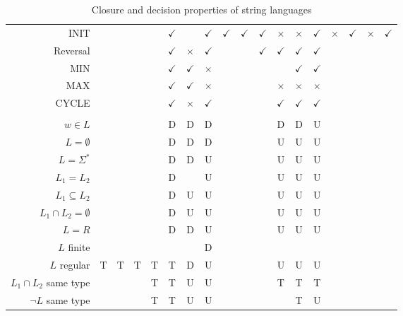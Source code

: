 \documentclass[letterpaper,10pt,oneside,landscape]{article}
\begin{document}
\begin{table}[tbph]
\begin{center}
\begin{tabular}{rcccc|ccccccccc|cccc}
        INIT & & & & & $\checkmark$ & & $\checkmark$ & $\checkmark$ & $\checkmark$ & $\checkmark$ & $\times$ & $\times$ & $\checkmark$ & $\times$ & $\checkmark$ & $\times$ & $\checkmark$\\
        Reversal & & & & & $\checkmark$ & $\times$ & $\checkmark$ & & & $\checkmark$ & $\checkmark$ & $\checkmark$ & $\checkmark$\\
        MIN & & & & & $\checkmark$ & $\checkmark$ & $\times$ & & & & & $\checkmark$ & $\checkmark$\\
        MAX & & & & & $\checkmark$ & $\checkmark$ & $\times$ & & & &$\times$ & $\times$ & $\times$\\
        CYCLE & & & & & $\checkmark$ & $\times$ & $\checkmark$ & & & &$\checkmark$ & $\checkmark$ & $\checkmark$\\
        & & & & & & & & & & & & &\\
        $w \in L$ & & & & & D & D & D & & & &D & D & U\\
        $L = \emptyset$ & & & & & D & D & D & & & &U & U & U\\
        $L = \Sigma^*$ & & & & & D & D & U & & & &U & U & U\\
        $L_1 = L_2$ & & & & & D & & U & & & &U & U & U\\
        $L_1 \subseteq L_2$ & & & & & D & U & U & & && U & U & U\\
        $L_1 \cap L_2 = \emptyset$ & & & & & D & U & U & & & & U & U & U\\
        $L=R$ & & & & & D & D & U & & & & U & U & U\\
        $L$ finite & & & & & & & D & & & & & &\\
        $L$ regular & T & T & T & T & T & D & U & & & & U & U & U\\
        $L_1 \cap L_2 $ same type & & & & T & T & U & U & & & & T & T & T\\
        $\neg L$ same type & & & & T & T & U & U & & & & & T & U
\end{tabular}
\end{center}
\caption{Closure and decision properties of string languages}
\end{table}
\end{document}
